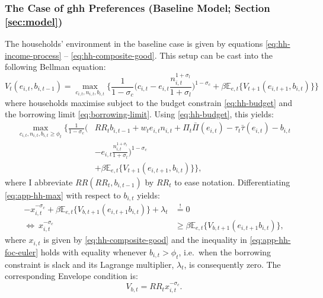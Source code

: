 \documentclass[a4paper,12pt]{article} %
\numberwithin{equation}{section} %
\numberwithin{figure}{section}
\numberwithin{table}{section}
\begin{document}
\begin{refsection}
\begin{appendices}
\subsubsection*{The Case of \Gls{ghh} Preferences (Baseline Model; Section \ref{sec:model})}

The households' environment in the baseline case is given by equations \eqref{eq:hh-income-process} -- \eqref{eq:hh-composite-good}. This setup can be cast into the following Bellman equation:
\begin{equation}
    V_t (e_{i,t}, b_{i,t-1}) = \max_{c_{i,t}, n_{i,t}, b_{i,t}} \Bigg\{ \frac{1}{1-\sigma_c} \Bigg( c_{i,t} - e_{i,t}\frac{n_{i,t}^{1+\sigma_l}}{1+\sigma_l} \Bigg)^{1-\sigma_c} + \beta \mathbb{E}_{e,t} \{ V_{t+1} (e_{i,t+1}, b_{i,t}) \} \Bigg\} \label{eq:app-hh-bellman}
\end{equation}
where households maximise subject to the budget constrain \eqref{eq:hh-budget} and the borrowing limit \eqref{eq:borrowing-limit}. Using \eqref{eq:hh-budget}, this yields:
\begin{align}
    \max_{c_{i,t}, n_{i,t}, b_{i,t} \ge \phi_t} \Bigg\{ \frac{1}{1-\sigma_c} \Bigg( &RR_t b_{i,t-1} + w_t e_{i,t} n_{i,t} + \Pi_t \bar{\Pi} (e_{i,t}) - \tau_t \bar{\tau} (e_{i,t}) - b_{i,t} \nonumber \\ 
    &- e_{i,t}\frac{n_{i,t}^{1+\sigma_l}}{1+\sigma_l} \Bigg)^{1-\sigma_c} \nonumber \\ 
    &+ \beta \mathbb{E}_{e,t} \{ V_{t+1} (e_{i,t+1}, b_{i,t}) \} \Bigg\}, \label{eq:app-hh-max}
\end{align}
where I abbreviate $RR (RR_t, b_{i,t-1})$ by $RR_t$ to ease notation. Differentiating \eqref{eq:app-hh-max} with respect to $b_{i,t}$ yields:
\begin{align}
    - x_{i,t}^{-\sigma_c} + \beta \mathbb{E}_{e,t} \{ V_{b,t+1} (e_{i,t+1} b_{i,t} ) \} + \lambda_t &\overset{!}{=} 0 \nonumber \\
    \Leftrightarrow \ x_{i,t}^{-\sigma_c} &\ge \beta \mathbb{E}_{e,t} \{ V_{b,t+1} (e_{i,t+1} b_{i,t} ) \}, \label{eq:app-hh-foc-euler}
\end{align}
where $x_{i,t}$ is given by \eqref{eq:hh-composite-good} and the inequality in \eqref{eq:app-hh-foc-euler} holds with equality whenever $b_{i,t} > \phi_t$, i.e.~when the borrowing constraint is slack and its Lagrange multiplier, $\lambda_t$, is consequently zero. The corresponding Envelope condition is:
\begin{equation}
    V_{b,t} = RR_t x_{i,t}^{-\sigma_c}. \label{eq:app-hh-foc-envelope}
\end{equation}


\end{appendices}
\end{refsection}
\end{document}
